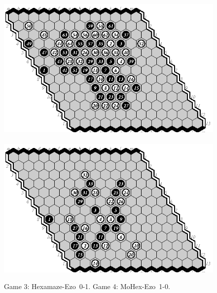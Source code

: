 \documentclass{icga}
\def\Eo{\mbox{\sc Ezo}}
\def\Hz{\mbox{\sc Hexamaze}}
\def\Mx{\mbox{\sc MoHex}}
\begin{document}
\begin{figure}[hbp]
\includegraphics[scale=1.2]{games/pix/13-03-he-0-1.eps}\hspace*{-1cm}\
\includegraphics[scale=1.2]{games/pix/13-04-me-1-0.eps}
\caption{Game 3: \Hz-\Eo\ 0-1. Game 4: \Mx-\Eo\ 1-0.}
\end{figure}
\end{document}

